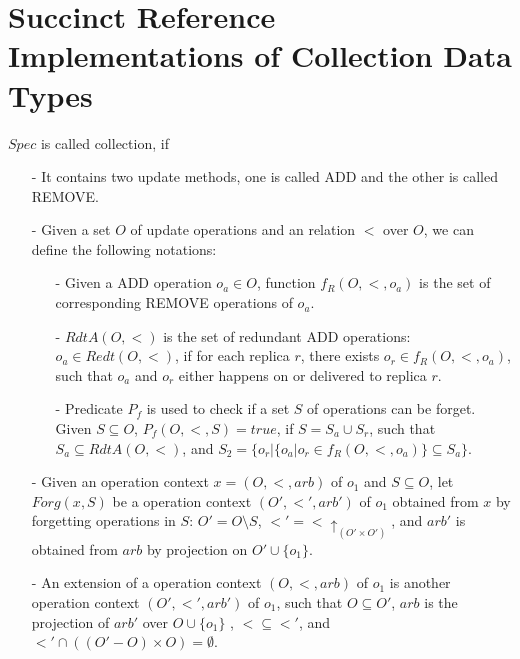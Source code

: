 
\section{Succinct Reference Implementations of Collection Data Types}
\label{sec:succinct reference implementations of collection data types} 

$Spec$ is called collection, if 

\begin{itemize}
\setlength{\itemsep}{0.5pt}
\item[-] It contains two update methods, one is called ADD and the other is called REMOVE. 

\item[-] Given a set $O$ of update operations and an relation $<$ over $O$, we can define the following notations: 
    
    \begin{itemize}
    \setlength{\itemsep}{0.5pt}
    \item[-] Given a ADD operation $o_a \in O$, function $f_R(O,<,o_a)$ is the set of corresponding REMOVE operations of $o_a$. 
    
    \item[-] $RdtA(O,<)$ is the set of redundant ADD operations: $o_a \in Redt(O,<)$, if for each replica $r$, there exists $o_r \in f_R(O,<,o_a)$, such that $o_a$ and $o_r$ either happens on or delivered to replica $r$. 
    
    \item[-] Predicate $P_f$ is used to check if a set $S$ of operations can be forget. Given $S \subseteq O$, $P_f(O,<,S) = \mathit{true}$, if $S = S_a \cup S_r$, such that $S_a \subseteq RdtA(O,<)$, and $S_2 = \{ o_r \vert  \{ o_a \vert o_r \in f_R(O,<,o_a) \} \subseteq S_a \}$. 
    \end{itemize} 

\item[-] Given an operation context $x = (O,<,\mathit{arb})$ of $o_1$ and $S \subseteq O$, let $Forg(x,S)$ be a operation context $(O',<',\mathit{arb}')$ of $o_1$ obtained from $x$ by forgetting operations in $S$: $O' = O \setminus S$, $<' = < \uparrow_{(O' \times O')}$, and $\mathit{arb}'$ is obtained from $\mathit{arb}$ by projection on $O' \cup \{ o_1 \}$.

\item[-] An extension of a operation context $(O,<,\mathit{arb})$ of $o_1$ is another operation context $(O',<',\mathit{arb}')$ of $o_1$, such that $O \subseteq O'$, $\mathit{arb}$ is the projection of $\mathit{arb}'$ over $O \cup \{ o_1 \}$ , $< \subseteq <'$, and $<' \cap ( (O'-O) \times O ) = \emptyset$.


\end{itemize}
